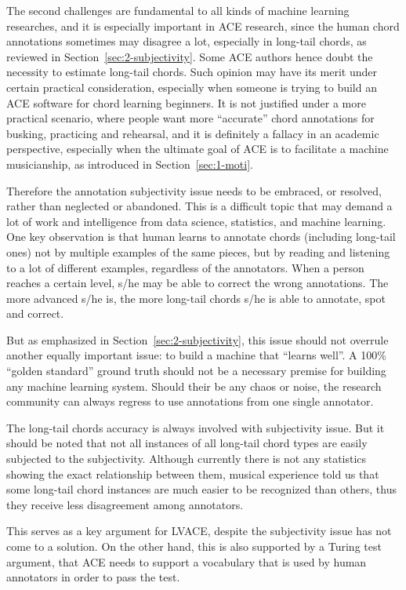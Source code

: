 The second challenges are fundamental to all kinds of machine learning researches, and it is especially important in ACE research, since the human chord annotations sometimes may disagree a lot, especially in long-tail chords, as reviewed in Section~\ref{sec:2-subjectivity}. Some ACE authors hence doubt the necessity to estimate long-tail chords. Such opinion may have its merit under certain practical consideration, especially when someone is trying to build an ACE software for chord learning beginners. It is not justified under a more practical scenario, where people want more ``accurate'' chord annotations for busking, practicing and rehearsal, and it is definitely a fallacy in an academic perspective, especially when the ultimate goal of ACE is to facilitate a machine musicianship, as introduced in Section~\ref{sec:1-moti}.

Therefore the annotation subjectivity issue needs to be embraced, or resolved, rather than neglected or abandoned. This is a difficult topic that may demand a lot of work and intelligence from data science, statistics, and machine learning. One key observation is that human learns to annotate chords (including long-tail ones) not by multiple examples of the same pieces, but by reading and listening to a lot of different examples, regardless of the annotators. When a person reaches a certain level, s/he may be able to correct the wrong annotations. The more advanced s/he is, the more long-tail chords s/he is able to annotate, spot and correct.

But as emphasized in Section~\ref{sec:2-subjectivity}, this issue should not overrule another equally important issue: to build a machine that ``learns well''. A 100\% ``golden standard'' ground truth should not be a necessary premise for building any machine learning system. Should their be any chaos or noise, the research community can always regress to use annotations from one single annotator.

The long-tail chords accuracy is always involved with subjectivity issue. But it should be noted that not all instances of all long-tail chord types are easily subjected to the subjectivity. Although currently there is not any statistics showing the exact relationship between them, musical experience told us that some long-tail chord instances are much easier to be recognized than others, thus they receive less disagreement among annotators.

This serves as a key argument for LVACE, despite the subjectivity issue has not come to a solution. On the other hand, this is also supported by a Turing test argument, that ACE needs to support a vocabulary that is used by human annotators in order to pass the test.


